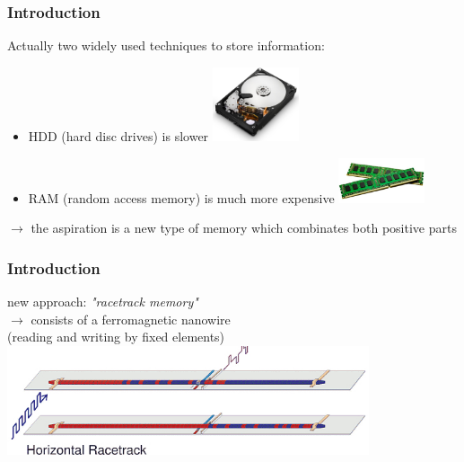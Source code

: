 \begin{frame}
	\frametitle{Introduction}
	Actually two widely used techniques to store information:\\ \vspace{5mm}
	\begin{itemize}
	\item HDD (hard disc drives) is slower 
	\includegraphics[width=0.2\textwidth]{../figs/HDD.jpg}
	\item RAM (random access memory) is much more expensive
	\includegraphics[width=0.2\textwidth]{../figs/RAM.jpg}
	\end{itemize}
	$\rightarrow$ the aspiration is a new type of memory which combinates both positive parts
	
\end{frame}

\begin{frame}  
	\frametitle{Introduction}
	new approach: \textit{"racetrack memory"}\\ \vspace{5mm}
	$\rightarrow$ consists of a ferromagnetic nanowire\\ \vspace{5mm}
	 (reading and writing by fixed elements)\\ \vspace{5mm}
	\includegraphics[width=0.8\textwidth]{../figs/horizontal_racetrack.jpg}
\end{frame}

